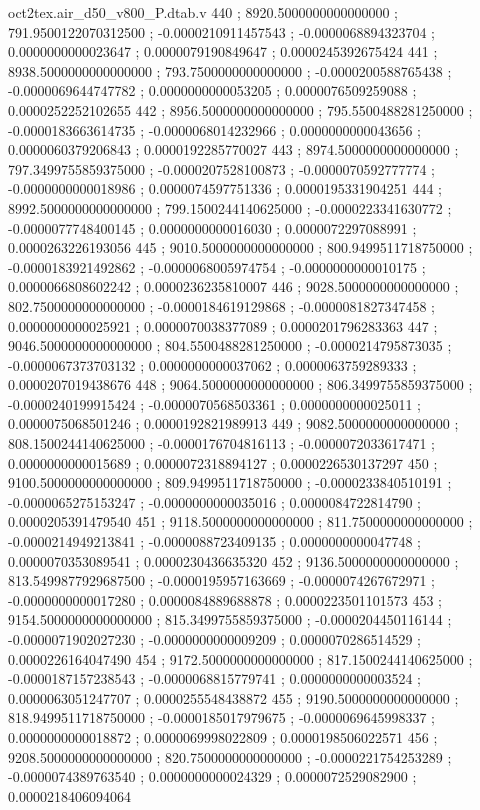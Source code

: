 \begin{filecontents}[overwrite]{oct2tex.air_d50_v800_P.dtab.v}
440 ; 8920.5000000000000000 ; 791.9500122070312500 ; -0.0000210911457543 ; -0.0000068894323704 ; 0.0000000000023647 ; 0.0000079190849647 ; 0.0000245392675424
441 ; 8938.5000000000000000 ; 793.7500000000000000 ; -0.0000200588765438 ; -0.0000069644747782 ; 0.0000000000053205 ; 0.0000076509259088 ; 0.0000252252102655
442 ; 8956.5000000000000000 ; 795.5500488281250000 ; -0.0000183663614735 ; -0.0000068014232966 ; 0.0000000000043656 ; 0.0000060379206843 ; 0.0000192285770027
443 ; 8974.5000000000000000 ; 797.3499755859375000 ; -0.0000207528100873 ; -0.0000070592777774 ; -0.0000000000018986 ; 0.0000074597751336 ; 0.0000195331904251
444 ; 8992.5000000000000000 ; 799.1500244140625000 ; -0.0000223341630772 ; -0.0000077748400145 ; 0.0000000000016030 ; 0.0000072297088991 ; 0.0000263226193056
445 ; 9010.5000000000000000 ; 800.9499511718750000 ; -0.0000183921492862 ; -0.0000068005974754 ; -0.0000000000010175 ; 0.0000066808602242 ; 0.0000236235810007
446 ; 9028.5000000000000000 ; 802.7500000000000000 ; -0.0000184619129868 ; -0.0000081827347458 ; 0.0000000000025921 ; 0.0000070038377089 ; 0.0000201796283363
447 ; 9046.5000000000000000 ; 804.5500488281250000 ; -0.0000214795873035 ; -0.0000067373703132 ; 0.0000000000037062 ; 0.0000063759289333 ; 0.0000207019438676
448 ; 9064.5000000000000000 ; 806.3499755859375000 ; -0.0000240199915424 ; -0.0000070568503361 ; 0.0000000000025011 ; 0.0000075068501246 ; 0.0000192821989913
449 ; 9082.5000000000000000 ; 808.1500244140625000 ; -0.0000176704816113 ; -0.0000072033617471 ; 0.0000000000015689 ; 0.0000072318894127 ; 0.0000226530137297
450 ; 9100.5000000000000000 ; 809.9499511718750000 ; -0.0000233840510191 ; -0.0000065275153247 ; -0.0000000000035016 ; 0.0000084722814790 ; 0.0000205391479540
451 ; 9118.5000000000000000 ; 811.7500000000000000 ; -0.0000214949213841 ; -0.0000088723409135 ; 0.0000000000047748 ; 0.0000070353089541 ; 0.0000230436635320
452 ; 9136.5000000000000000 ; 813.5499877929687500 ; -0.0000195957163669 ; -0.0000074267672971 ; -0.0000000000017280 ; 0.0000084889688878 ; 0.0000223501101573
453 ; 9154.5000000000000000 ; 815.3499755859375000 ; -0.0000204450116144 ; -0.0000071902027230 ; -0.0000000000009209 ; 0.0000070286514529 ; 0.0000226164047490
454 ; 9172.5000000000000000 ; 817.1500244140625000 ; -0.0000187157238543 ; -0.0000068815779741 ; 0.0000000000003524 ; 0.0000063051247707 ; 0.0000255548438872
455 ; 9190.5000000000000000 ; 818.9499511718750000 ; -0.0000185017979675 ; -0.0000069645998337 ; 0.0000000000018872 ; 0.0000069998022809 ; 0.0000198506022571
456 ; 9208.5000000000000000 ; 820.7500000000000000 ; -0.0000221754253289 ; -0.0000074389763540 ; 0.0000000000024329 ; 0.0000072529082900 ; 0.0000218406094064

\end{filecontents}

